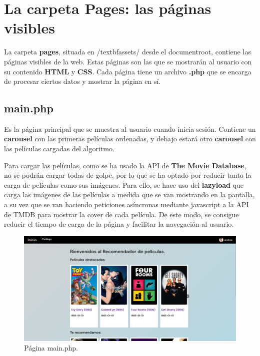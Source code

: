 \documentclass[a4paper, 12pt]{report}
\begin{document}
    \chapter{La carpeta Pages: las páginas visibles}

    La carpeta \textbf{pages}, situada en /textbf{assets/} desde el documentroot, contiene las páginas visibles de la
    web. Estas páginas son las que se mostrarán al usuario con su contenido \textbf{HTML} y \textbf{CSS}. Cada página tiene un archivo \textbf{.php} que se encarga
    de procesar ciertos datos y mostrar la página en sí.

    \section{main.php}

        Es la página principal que se muestra al usuario cuando inicia sesión. Contiene un \textbf{carousel} con las
        primeras películas ordenadas, y debajo estará otro \textbf{carousel} con las películas cargadas del algoritmo.

        Para cargar las películas, como se ha usado la API de \textbf{The Movie Database}, no se podrán cargar todas de
        golpe, por lo que se ha optado por reducir tanto la carga de películas como sus imágenes. Para ello, se hace uso
        del \textbf{lazyload} que carga las imágenes de las películas a medida que se van mostrando en la pantalla, a su
        vez que se van haciendo peticiones asíncronas mediante javascript a la API de TMDB para mostrar la cover de cada película. De este
        modo, se consigue reducir el tiempo de carga de la página y facilitar la navegación al usuario.

    \begin{figure}[H]
        \centering
        \includegraphics[scale=0.20]{resources/img/main.png}
        \caption{Página main.php.}
        \label{fig:main}
    \end{figure}
\end{document}
